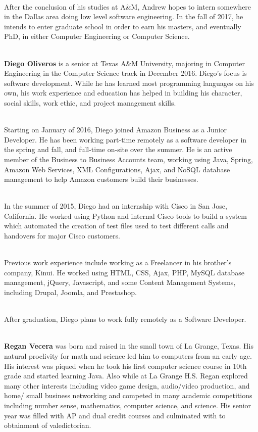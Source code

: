 \documentclass[12pt]{extarticle}
\begin{document}
\ \\
After the conclusion of his studies at A\&M, Andrew hopes to intern somewhere in the Dallas area doing low level software engineering.  In the fall of 2017, he intends to enter graduate school in order to earn his masters, and eventually PhD, in either Computer Engineering or Computer Science.  

\ \\
{\large \textbf{Diego Oliveros}} is a senior at Texas A\&M University, majoring in Computer Engineering in the Computer Science track in December 2016. Diego's focus is software development. While he has learned most programming languages on his own, his work experience and education has helped in building his character, social skills, work ethic, and project management skills.

\ \\
Starting on January of 2016, Diego joined Amazon Business as a Junior Developer. He has been working part-time remotely as a software developer in the spring and fall, and full-time on-site over the summer. He is an active member of the Business to Business Accounts team, working using Java, Spring, Amazon Web Services, XML Configurations, Ajax, and NoSQL database management to help Amazon customers build their businesses.

\ \\
In the summer of 2015, Diego had an internship with Cisco in San Jose, California. He worked using Python and internal Cisco tools to build a system which automated the creation of test files used to test different calls and handovers for major Cisco customers.

\ \\
Previous work experience include working as a Freelancer in his brother's company, Kinui. He worked using HTML, CSS, Ajax, PHP, MySQL database management, jQuery, Javascript, and some Content Management Systems, including Drupal, Joomla, and Prestashop.

\ \\
After graduation, Diego plans to work fully remotely as a Software Developer.

\ \\
{\large \textbf{Regan Vecera}} was born and raised in the small town of La Grange, Texas. His natural proclivity for math and science led him to computers from an early age. His interest was piqued when he took his first computer science course in 10th grade and started learning Java. Also while at La Grange H.S. Regan explored many other interests including video game design, audio/video production, and home/ small business networking and competed in many academic competitions including number sense, mathematics, computer science, and science. His senior year was filled with AP and dual credit courses and culminated with to obtainment of valedictorian.  
\end{document}
